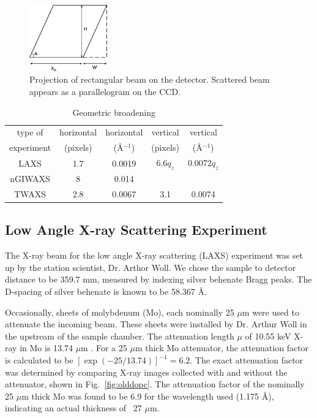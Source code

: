 \begin{figure}[htbp]
  \centering
  \includegraphics[width=0.3\textwidth]{figures/ripple/MMs/transmission/geometric_broadening4}
  \caption{Projection of rectangular beam on the detector. Scattered beam
  appears as a parallelogram on the CCD.}
  \label{fig:gb_trans3}
\end{figure}

\begin{table}[p]
  \centering
  \begin{tabular}{ccccc}
    \hline
    type of & horizontal & horizontal & vertical & vertical \\
    experiment & (pixels) & (\AA$^{-1}$) & (pixels) & (\AA$^{-1}$) \\
    \hline
    LAXS & 1.7 & 0.0019 & 6.6$q_z$ & 0.0072$q_z$ \\
    nGIWAXS & 8 & 0.014 &  & \\
    TWAXS & 2.8 & 0.0067 & 3.1 & 0.0074 \\
    \hline
  \end{tabular}
  \caption{Geometric broadening}
  \label{tb:geometric_broadening}
\end{table}

\newpage
\subsection{Low Angle X-ray Scattering Experiment}\label{sec:LAXS_method}
The X-ray beam for the low angle X-ray scattering (LAXS) experiment 
was set up by the station scientist, Dr. Arthor Woll.
We chose the sample to detector distance to be 359.7 mm, measured by indexing
silver behenate Bragg peaks. The D-spacing of silver behenate is known to be
58.367 \AA.

Occasionally, sheets of molybdenum (Mo), each nominally 25 $\mu$m were 
used to attenuate the incoming beam. 
These sheets were installed by Dr. Arthur Woll in the upstream of the sample chamber.
The attenuation length $\mu$ of 10.55 keV X-ray in Mo is 13.74 $\mu$m \cite{ref:cxro}.
For a 25 $\mu$m thick Mo attenuator, the attenuation factor is calculated to be
$[\exp(-25/13.74)]^{-1} = 6.2$. The exact attenuation factor was determined
by comparing X-ray images collected with and without the attenuator, 
shown in Fig.~\ref{fig:olddopc}.
The attenuation factor of the nominally 25 $\mu$m thick Mo was found to 
be 6.9 for the wavelength used (1.175 \AA), indicating an actual thickness
of ~27 $\mu$m. 

